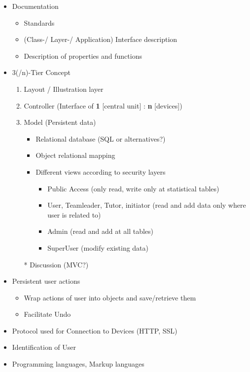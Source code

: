 \documentclass[11pt]{article}
\begin{document}
	\begin{itemize}
	\item Documentation
		\begin{itemize}
		\item Standards
		\item (Class-/ Layer-/ Application) Interface description 
		\item Description of properties and functions
		\end{itemize}
	\item 3(/n)-Tier Concept
		\begin{enumerate}
		\item Layout / Illustration layer
		\item Controller (Interface of \textbf{1} [central unit] : \textbf{n}  [devices])
		\item Model (Persistent data)
			\begin{itemize}
			\item Relational database (SQL or alternatives?)
			\item Object relational mapping
			\item Different views according to security layers
				\begin{itemize}
				\item Public Access (only read, write only at statistical tables)
				\item User, Teamleader, Tutor, initiator (read and add data only where user is related to)
				\item Admin (read and add at all tables)
				\item SuperUser (modify existing data)
				\end{itemize}
			\end{itemize}
		\item[*] Discussion (MVC?)
		\end{enumerate}
	\item Persistent user actions
		\begin{itemize}
		\item Wrap actions of user into objects and save/retrieve them \cite{entwurfsmuster}
		\item Facilitate Undo
		\end{itemize}
	\item Protocol used for Connection to Devices (HTTP, SSL)
	\item Identification of User
	\item Programming languages, Markup languages
		\begin{itemize}

\end{itemize}
\end{itemize}
\end{document}
